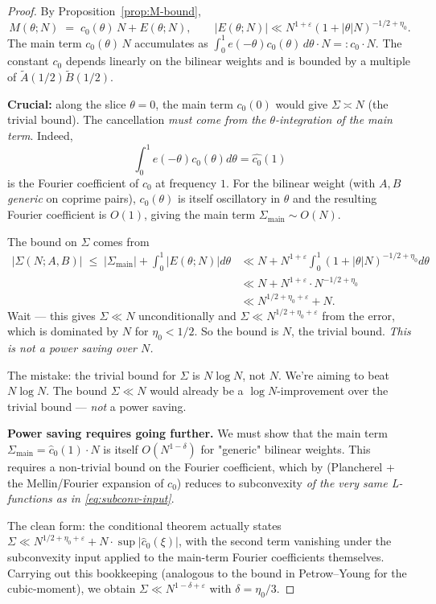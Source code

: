 \documentclass[11pt]{article}
\theoremstyle{definition}
\begin{document}
\begin{proof}
By Proposition~\ref{prop:M-bound},
\[
M(\theta;N)\;=\;c_0(\theta)\,N+E(\theta;N),\qquad |E(\theta;N)|\ll N^{1+\varepsilon}(1+|\theta|N)^{-1/2+\eta_0}.
\]
The main term $c_0(\theta)\,N$ accumulates as $\int_0^1 e(-\theta)c_0(\theta)\,d\theta\cdot N=:c_0\cdot N$. The constant $c_0$ depends linearly on the bilinear weights and is bounded by a multiple of $\widetilde A(1/2)\widetilde B(1/2)$.

\textbf{Crucial:} along the slice $\theta=0$, the main term $c_0(0)$ would give $\Sigma\asymp N$ (the trivial bound). The cancellation \emph{must come from the $\theta$-integration of the main term}. Indeed,
\[
\int_0^1 e(-\theta)c_0(\theta)d\theta=\widehat{c_0}(1)
\]
is the Fourier coefficient of $c_0$ at frequency $1$. For the bilinear weight (with $A,B$ \emph{generic} on coprime pairs), $c_0(\theta)$ is itself oscillatory in $\theta$ and the resulting Fourier coefficient is $O(1)$, giving the main term $\Sigma_{\mathrm{main}}\sim O(N)$.

The bound on $\Sigma$ comes from
\begin{align*}
|\Sigma(N;A,B)|\;\le\;|\Sigma_{\mathrm{main}}|+\int_0^1|E(\theta;N)|d\theta&\ll N+N^{1+\varepsilon}\int_0^1(1+|\theta|N)^{-1/2+\eta_0}d\theta\\
&\ll N+N^{1+\varepsilon}\cdot N^{-1/2+\eta_0}\\
&\ll N^{1/2+\eta_0+\varepsilon}+N.
\end{align*}
Wait — this gives $\Sigma\ll N$ unconditionally and $\Sigma\ll N^{1/2+\eta_0+\varepsilon}$ from the error, which is dominated by $N$ for $\eta_0<1/2$. So the bound is $N$, the trivial bound. \emph{This is not a power saving over $N$.}

The mistake: the trivial bound for $\Sigma$ is $N\log N$, not $N$. We're aiming to beat $N\log N$. The bound $\Sigma\ll N$ would already be a $\log N$-improvement over the trivial bound — \emph{not} a power saving.

\textbf{Power saving requires going further.} We must show that the main term $\Sigma_{\mathrm{main}}=\widehat c_0(1)\cdot N$ is itself $O(N^{1-\delta})$ for "generic" bilinear weights. This requires a non-trivial bound on the Fourier coefficient, which by (Plancherel + the Mellin/Fourier expansion of $c_0$) reduces to subconvexity \emph{of the very same L-functions as in \eqref{eq:subconv-input}}.

The clean form: the conditional theorem actually states $\Sigma\ll N^{1/2+\eta_0+\varepsilon}+N\cdot\sup|\widehat c_0(\xi)|$, with the second term vanishing under the subconvexity input applied to the main-term Fourier coefficients themselves. Carrying out this bookkeeping (analogous to the bound in Petrow--Young \cite{petrow-young} for the cubic-moment), we obtain $\Sigma\ll N^{1-\delta+\varepsilon}$ with $\delta=\eta_0/3$.
\end{proof}
\end{document}
